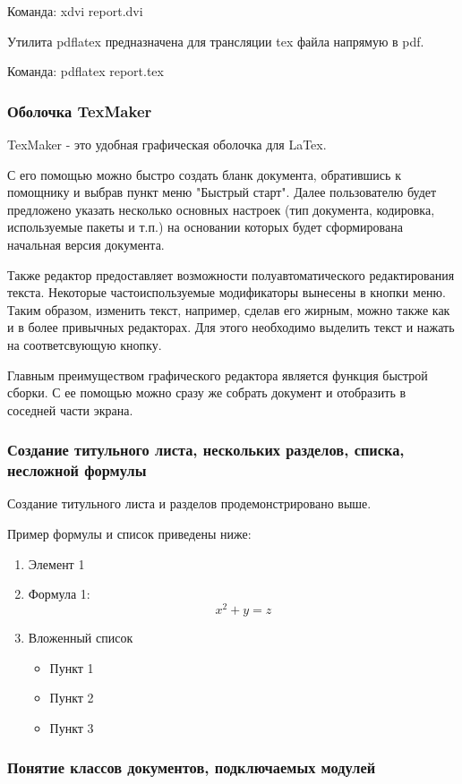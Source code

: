 \documentclass[a4paper, 12pt]{article}
\begin{document}
Команда: xdvi report.dvi

Утилита pdflatex предназначена для трансляции tex файла напрямую в pdf.

Команда: pdflatex report.tex

\subsubsection{Оболочка TexMaker}

TexMaker - это удобная графическая оболочка для LaTex.

С его помощью можно быстро создать бланк документа, обратившись к помощнику и выбрав пункт меню "Быстрый старт". Далее пользователю будет предложено указать несколько основных настроек (тип документа, кодировка, используемые пакеты и т.п.) на основании которых будет сформирована начальная версия документа.

Также редактор предоставляет возможности полуавтоматического редактирования текста. Некоторые частоиспользуемые модификаторы вынесены в кнопки меню. Таким образом, изменить текст, например, сделав его жирным, можно также как и в более привычных редакторах. Для этого необходимо выделить текст и нажать на соответсвующую кнопку.

Главным преимуществом графического редактора является функция быстрой сборки. С ее помощью можно сразу же собрать документ и отобразить в соседней части экрана.

\subsubsection{Создание титульного листа, нескольких разделов, списка, несложной формулы}

Создание титульного листа и  разделов продемонстрировано выше.

Пример формулы и список приведены ниже:
\begin{enumerate}
\item Элемент 1
\item Формула 1: $$ x^2+y=z $$
\item Вложенный список
	\begin{itemize}
	\item Пункт 1
	\item Пункт 2
	\item Пункт 3
	\end{itemize}
\end{enumerate}

\subsubsection{Понятие классов документов, подключаемых модулей}
\end{document}
